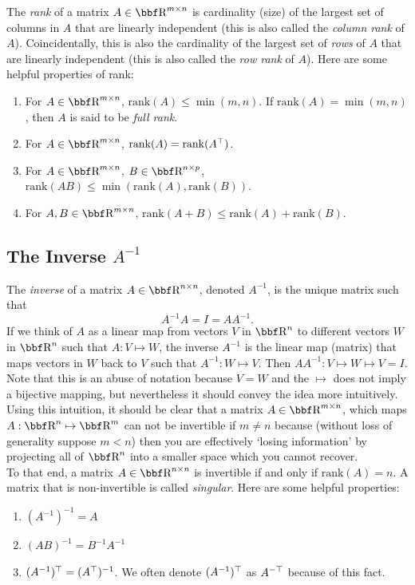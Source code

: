 \documentclass{article}
\newcommand{\rank}{\mathrm{rank}}
\begin{document}
The \textit{rank} of a matrix $A\in\RR^{m\times n}$ is cardinality (size) of the largest set of
columns in $A$ that are linearly independent (this is also called the \textit{column rank} of $A$).
Coincidentally, this is also the cardinality of the largest set of \textit{rows} of $A$ that are 
linearly independent (this is also called the \textit{row rank} of $A$). Here are some helpful
properties of rank:
\begin{enumerate}
\item For $A\in\RR^{m\times n}$, $\rank(A)\leq\min(m,n)$. If $\rank(A)=\min(m,n)$, then $A$
    is said to be \textit{full rank}.
\item For $A\in\RR^{m\times n}$, $\rank(A) = \rank(A^\T)$.
\item For $A\in\RR^{m\times n}$, $B\in\RR^{n\times p}$, $\rank(AB)\leq \min(\rank(A),\rank(B))$.
\item For $A,B\in\RR^{m\times n}$, $\rank(A+B)\leq \rank(A) + \rank(B)$.
\end{enumerate}

\subsection{The Inverse $A^{-1}$}

The \textit{inverse} of a matrix $A\in\RR^{n\times n}$, denoted $A^{-1}$, is the unique matrix
such that
\[
    A^{-1}A = I = AA^{-1}.
\]
If we think of $A$ as a linear map from vectors $V$ in $\RR^n$ to different vectors $W$ in $\RR^n$
such that $A : V \mapsto W$, the inverse $A^{-1}$ is the linear map (matrix) that maps vectors in
$W$ back to $V$ such that $A^{-1}: W \mapsto V$. Then $AA^{-1}:V\mapsto W\mapsto V = I$.
Note that this is an abuse of notation because
$V=W$ and the $\mapsto$ does not imply a bijective mapping, but nevertheless it should convey the
idea more intuitively.\\

Using this intuition, it should be clear that a matrix $A\in\RR^{m\times n}$, which maps $A: \RR^n
\mapsto \RR^m$ can not be invertible if $m\neq n$ because (without loss of generality suppose $m < n$)
then you are effectively `losing information' by projecting all of $\RR^n$ into a smaller space which
you cannot recover.\\

To that end, a matrix $A\in\RR^{n\times n}$ is invertible if and only if $\rank(A) = n$. A matrix that
is non-invertible is called \textit{singular}. Here are some helpful properties:
\begin{enumerate}
\item $(A^{-1})^{-1} = A$
\item $(AB)^{-1} = B^{-1}A^{-1}$
\item $(A^{-1})^\top = (A^\top)^{-1}$. We often denote $(A^{-1})^\top$ as $A^{-\top}$ because
    of this fact.\\
\end{enumerate}
\end{document}
